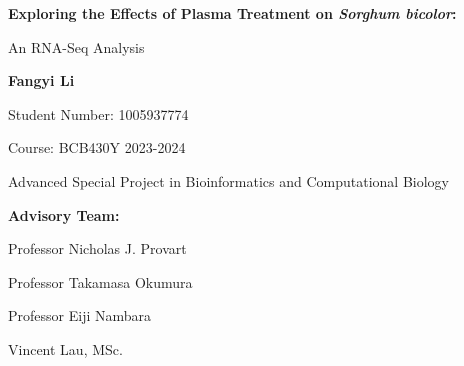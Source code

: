 \documentclass[12pt,letterpaper]{article}
\newcommand{\mydate}{\formatdate{4}{4}{2024}}
\begin{document}
\begin{center}
{\LARGE \bfseries Exploring the Effects of Plasma Treatment on \textit{Sorghum bicolor}: \par
An RNA-Seq Analysis\par}
\vspace{0.5cm}

{\Large \textbf{Fangyi Li}\par}
\vspace{0.5cm}

{\small Student Number: 1005937774\par}
\vspace{0.5cm}

{\small Course: BCB430Y 2023-2024\par
Advanced Special Project in Bioinformatics and Computational Biology\par}
\vspace{0.5cm}

{\small \textbf{Advisory Team:}\par
Professor Nicholas J. Provart\par
Professor Takamasa Okumura\par
Professor Eiji Nambara\par
Vincent Lau, MSc.\par}
\vspace{0.5cm}

{\small \mydate} %
\vspace{0.5cm}
    
\end{center}
\end{document}

